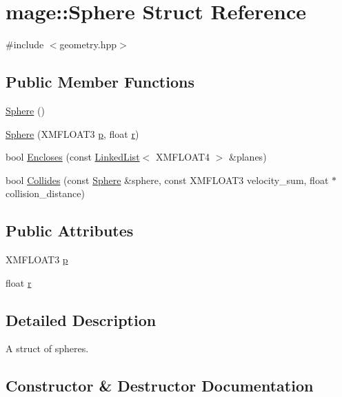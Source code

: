 \hypertarget{structmage_1_1_sphere}{}\section{mage\+:\+:Sphere Struct Reference}
\label{structmage_1_1_sphere}


{\ttfamily \#include $<$geometry.\+hpp$>$}

\subsection*{Public Member Functions}
\begin{DoxyCompactItemize}
\item 
\hyperlink{structmage_1_1_sphere_a65bbd9465f6e42b22f3f522ed7053758}{Sphere} ()
\item 
\hyperlink{structmage_1_1_sphere_a8b0d8c45a933c4863cd0727c5ef00b23}{Sphere} (X\+M\+F\+L\+O\+A\+T3 \hyperlink{structmage_1_1_sphere_a3eaad90e13e18fe66a5f927a40e4a96b}{p}, float \hyperlink{structmage_1_1_sphere_af9121b33471e72b3df2fb032f5f68151}{r})
\item 
bool \hyperlink{structmage_1_1_sphere_ad03a36fda37c1b832dee7aacfb4989fa}{Encloses} (const \hyperlink{classmage_1_1_linked_list}{Linked\+List}$<$ X\+M\+F\+L\+O\+A\+T4 $>$ \&planes)
\item 
bool \hyperlink{structmage_1_1_sphere_a0f19a650a33b855d0e49000d0a508838}{Collides} (const \hyperlink{structmage_1_1_sphere}{Sphere} \&sphere, const X\+M\+F\+L\+O\+A\+T3 velocity\+\_\+sum, float $\ast$collision\+\_\+distance)
\end{DoxyCompactItemize}
\subsection*{Public Attributes}
\begin{DoxyCompactItemize}
\item 
X\+M\+F\+L\+O\+A\+T3 \hyperlink{structmage_1_1_sphere_a3eaad90e13e18fe66a5f927a40e4a96b}{p}
\item 
float \hyperlink{structmage_1_1_sphere_af9121b33471e72b3df2fb032f5f68151}{r}
\end{DoxyCompactItemize}


\subsection{Detailed Description}
A struct of spheres. 

\subsection{Constructor \& Destructor Documentation}
\hypertarget{structmage_1_1_sphere_a65bbd9465f6e42b22f3f522ed7053758}{}\label{structmage_1_1_sphere_a65bbd9465f6e42b22f3f522ed7053758} 
